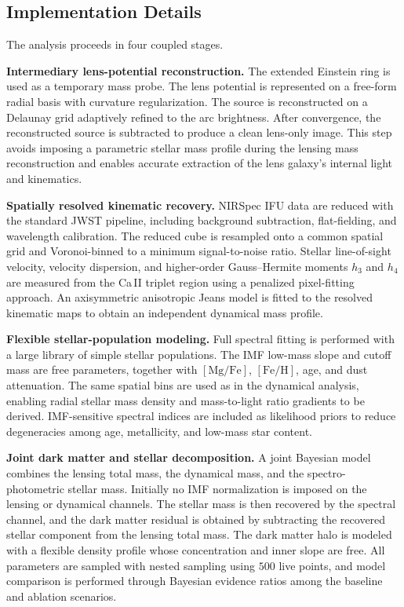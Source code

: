 \documentclass{article}
\begin{document}
\subsection{Implementation Details}
The analysis proceeds in four coupled stages.

\textbf{Intermediary lens-potential reconstruction.} The extended Einstein ring is used as a temporary mass probe. The lens potential is represented on a free-form radial basis with curvature regularization. The source is reconstructed on a Delaunay grid adaptively refined to the arc brightness. After convergence, the reconstructed source is subtracted to produce a clean lens-only image. This step avoids imposing a parametric stellar mass profile during the lensing mass reconstruction and enables accurate extraction of the lens galaxy's internal light and kinematics.

\textbf{Spatially resolved kinematic recovery.} NIRSpec IFU data are reduced with the standard JWST pipeline, including background subtraction, flat-fielding, and wavelength calibration. The reduced cube is resampled onto a common spatial grid and Voronoi-binned to a minimum signal-to-noise ratio. Stellar line-of-sight velocity, velocity dispersion, and higher-order Gauss--Hermite moments $h_3$ and $h_4$ are measured from the Ca\,II triplet region using a penalized pixel-fitting approach. An axisymmetric anisotropic Jeans model is fitted to the resolved kinematic maps to obtain an independent dynamical mass profile.

\textbf{Flexible stellar-population modeling.} Full spectral fitting is performed with a large library of simple stellar populations. The IMF low-mass slope and cutoff mass are free parameters, together with $[\mathrm{Mg}/\mathrm{Fe}]$, $[\mathrm{Fe}/\mathrm{H}]$, age, and dust attenuation. The same spatial bins are used as in the dynamical analysis, enabling radial stellar mass density and mass-to-light ratio gradients to be derived. IMF-sensitive spectral indices are included as likelihood priors to reduce degeneracies among age, metallicity, and low-mass star content.

\textbf{Joint dark matter and stellar decomposition.} A joint Bayesian model combines the lensing total mass, the dynamical mass, and the spectro-photometric stellar mass. Initially no IMF normalization is imposed on the lensing or dynamical channels. The stellar mass is then recovered by the spectral channel, and the dark matter residual is obtained by subtracting the recovered stellar component from the lensing total mass. The dark matter halo is modeled with a flexible density profile whose concentration and inner slope are free. All parameters are sampled with nested sampling using $500$ live points, and model comparison is performed through Bayesian evidence ratios among the baseline and ablation scenarios.
\end{document}
